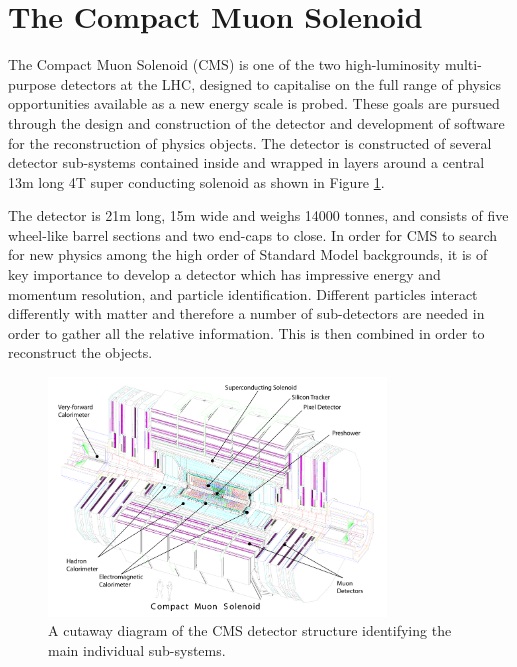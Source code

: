 \section{The Compact Muon Solenoid}

The Compact Muon Solenoid (CMS) is one of the two high-luminosity multi-purpose detectors at the LHC, designed to capitalise on the full range of physics opportunities available as a new energy scale is probed. These goals are pursued through the design and construction of the detector and development of software for the reconstruction of physics objects. The detector is constructed of several detector sub-systems contained inside and wrapped in layers around a central 13m long 4T super conducting solenoid as shown in Figure \ref{fig:CMS_Struct}. 

The detector is 21m long, 15m wide and weighs 14000 tonnes, and consists of five wheel-like barrel sections and two end-caps to close. In order for CMS to search for new physics among the high order of Standard Model backgrounds, it is of key importance to develop a detector which has impressive energy and momentum resolution, and particle identification. Different particles interact differently with matter and therefore a number of sub-detectors are needed in order to gather all the relative information. This is then combined in order to reconstruct the objects. 

\begin{figure}
\centering
\includegraphics[width=0.8\textwidth]{Figures/Detector/CMS_Structure}
\caption{A cutaway diagram of the CMS detector structure identifying the main individual sub-systems.}
\label{fig:CMS_Struct}
\end{figure}

